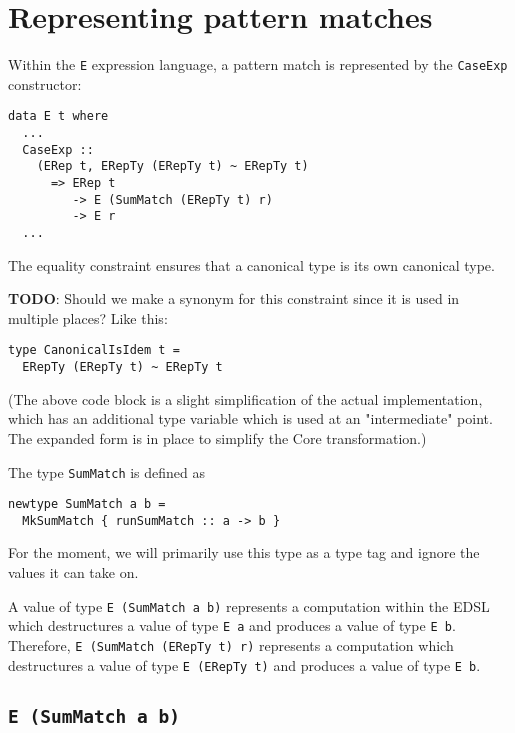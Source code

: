 \documentclass[sigplan,screen]{acmart}
\newcommand{\ttt}{\texttt}
\begin{document}
\section{Representing pattern matches}

Within the \ttt{E} expression language, a pattern match is represented by the
\ttt{CaseExp} constructor:

\begin{lstlisting}
data E t where
  ...
  CaseExp ::
    (ERep t, ERepTy (ERepTy t) ~ ERepTy t)
      => ERep t
         -> E (SumMatch (ERepTy t) r)
         -> E r
  ...
\end{lstlisting}

The equality constraint ensures that a canonical type is its own canonical type.

\begin{tcolorbox}
  \textbf{TODO}: Should we make a synonym for this constraint since it is used in
multiple places? Like this:
\begin{lstlisting}
type CanonicalIsIdem t =
  ERepTy (ERepTy t) ~ ERepTy t
\end{lstlisting}
\end{tcolorbox}

(The above code block is a slight simplification of the actual implementation,
which has an additional type variable which is used at an "intermediate" point.
The expanded form is in place to simplify the Core transformation.)

The type \ttt{SumMatch} is defined as

\begin{lstlisting}
newtype SumMatch a b =
  MkSumMatch { runSumMatch :: a -> b }
\end{lstlisting}

For the moment, we will primarily use this type as a type tag and ignore
the values it can take on.

A value of type \ttt{E (SumMatch a b)} represents a computation within the EDSL
which destructures a value of type \ttt{E a} and produces a value of type \ttt{E b}.
Therefore, \ttt{E (SumMatch (ERepTy t) r)} represents a computation which destructures
a value of type \ttt{E (ERepTy t)} and produces a value of type \ttt{E b}.



\subsection{\ttt{E (SumMatch a b)}}
\end{document}
